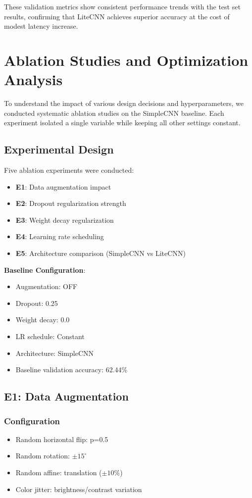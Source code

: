 \documentclass[12pt,a4paper]{article}
\begin{document}
These validation metrics show consistent performance trends with the test set results, confirming that LiteCNN achieves superior accuracy at the cost of modest latency increase.

\section{Ablation Studies and Optimization Analysis}

To understand the impact of various design decisions and hyperparameters, we conducted systematic ablation studies on the SimpleCNN baseline. Each experiment isolated a single variable while keeping all other settings constant.

\subsection{Experimental Design}
Five ablation experiments were conducted:
\begin{itemize}[leftmargin=*]
    \item \textbf{E1}: Data augmentation impact
    \item \textbf{E2}: Dropout regularization strength
    \item \textbf{E3}: Weight decay regularization
    \item \textbf{E4}: Learning rate scheduling
    \item \textbf{E5}: Architecture comparison (SimpleCNN vs LiteCNN)
\end{itemize}

\textbf{Baseline Configuration}:
\begin{itemize}[leftmargin=*]
    \item Augmentation: OFF
    \item Dropout: 0.25
    \item Weight decay: 0.0
    \item LR schedule: Constant
    \item Architecture: SimpleCNN
    \item Baseline validation accuracy: 62.44\%
\end{itemize}

\subsection{E1: Data Augmentation}

\subsubsection{Configuration}
\begin{itemize}[leftmargin=*]
    \item Random horizontal flip: p=0.5
    \item Random rotation: $\pm 15^\circ$
    \item Random affine: translation ($\pm 10\%$)
    \item Color jitter: brightness/contrast variation
\end{itemize}
\end{document}
